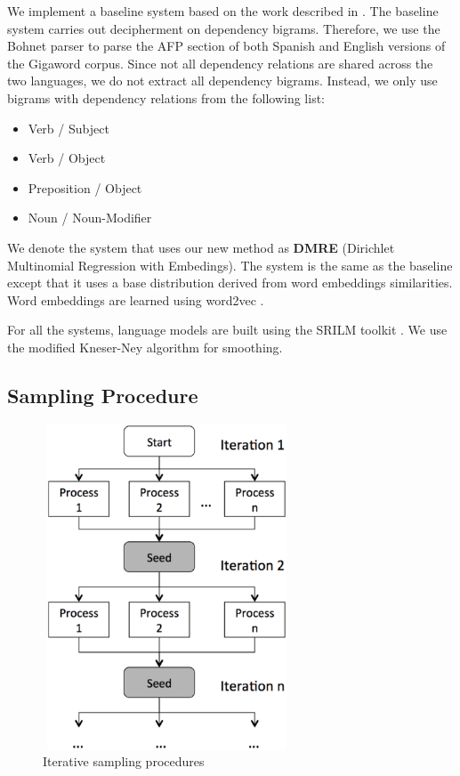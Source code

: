 We implement a baseline system based on the work described in . The baseline system carries out decipherment on dependency bigrams.  Therefore, we use the Bohnet parser \cite{bohnet:2010:PAPERS} to parse the AFP section of both Spanish and English versions of the Gigaword corpus. Since not all dependency relations are shared across the two languages, we do not extract all dependency bigrams. Instead, we only use bigrams with dependency relations from the following list: 

\begin{itemize}
\item Verb / Subject
\item Verb / Object
\item Preposition / Object
\item Noun / Noun-Modifier
\end{itemize}

We denote the system that uses our new method as \textbf{DMRE} (Dirichlet Multinomial Regression with Embedings). The system is the same as the baseline except that it uses a base distribution derived from word embeddings similarities. Word embeddings are learned using word2vec \cite{mikolov2013efficient}.

For all the systems, language models are built using the SRILM toolkit \cite{srilm}. We use the modified Kneser-Ney \cite{KneserNey95} algorithm for smoothing.


\subsection{Sampling Procedure}
\label{sample_procedure}

 \begin{figure}[!ht]
  \centering
  \includegraphics[width=2.9in,height=3.8in]{iterative_sampling}
  \caption{Iterative sampling procedures}
\label{iterative_sampling}
\end{figure}

